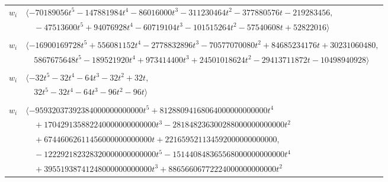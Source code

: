 \documentclass[11pt]{article}
\begin{document}
\begin{longtable}{@{}ll@{}}
$w_i$ & $\langle -70189056t^{5}-147881984t^{4}-86016000t^{3}-311230464t^{2}-377880576t-219283456,$\\
 & $\quad -47513600t^{5}+94076928t^{4}-60719104t^{3}-101515264t^{2}-57540608t+52822016\rangle$\\
\addlinespace[2pt]
\multicolumn{2}{@{}p{0.97\textwidth}@{}}{$i=39$, $D_i=128$, $e_i=2$, $\rho_{ij}$: $0{:}3, \allowbreak 2{:}3, \allowbreak 5{:}2, \allowbreak 7{:}2, \allowbreak 20{:}1, \allowbreak 21{:}1, \allowbreak 22{:}2, \allowbreak 23{:}2, \allowbreak 24{:}3, \allowbreak 25{:}1, \allowbreak 44{:}2, \allowbreak 49{:}2, \allowbreak 50{:}1, \allowbreak 52{:}2, \allowbreak 53{:}3, \allowbreak 64{:}3, \allowbreak 79{:}2, \allowbreak 80{:}3$}\\
$w_i$ & $\langle -16900169728t^{5}+556081152t^{4}-2778832896t^{3}-70577070080t^{2}+84685234176t+30231060480,$\\
 & $\quad 5867675648t^{5}-189521920t^{4}+973414400t^{3}+24501018624t^{2}-29413711872t-10498940928\rangle$\\
\addlinespace[2pt]
\multicolumn{2}{@{}p{0.97\textwidth}@{}}{$i=40$, $D_i=4$, $e_i=3$, $\rho_{ij}$: $3{:}3, \allowbreak 6{:}1, \allowbreak 7{:}1, \allowbreak 8{:}3, \allowbreak 44{:}1, \allowbreak 62{:}3$}\\
$w_i$ & $\langle -32t^{5}-32t^{4}-64t^{3}-32t^{2}+32t,$\\
 & $\quad 32t^{5}-32t^{4}-64t^{3}-96t^{2}-96t\rangle$\\
\addlinespace[2pt]
\multicolumn{2}{@{}p{0.97\textwidth}@{}}{$i=41$, $D_i=250000000000$, $e_i=1$, $\rho_{ij}$: $0{:}3, \allowbreak 1{:}1, \allowbreak 3{:}2, \allowbreak 6{:}2, \allowbreak 7{:}2, \allowbreak 8{:}3, \allowbreak 9{:}2, \allowbreak 10{:}2, \allowbreak 11{:}3, \allowbreak 12{:}2, \allowbreak 13{:}2, \allowbreak 14{:}3, \allowbreak 26{:}1, \allowbreak 29{:}3, \allowbreak 30{:}2, \allowbreak 31{:}3, \allowbreak 45{:}3, \allowbreak 59{:}1, \allowbreak 60{:}1, \allowbreak 61{:}3, \allowbreak 66{:}2, \allowbreak 70{:}3, \allowbreak 77{:}3, \allowbreak 80{:}1$}\\
$w_i$ & $\langle -95932037392384000000000000t^{5}+81288094168064000000000000t^{4}$\\
 & $\quad +170429135882240000000000000t^{3}-281848236300288000000000000t^{2}$\\
 & $\quad +67446062611456000000000000t+221659521134592000000000000,$\\
 & $\quad -122292182328320000000000000t^{5}-151440848365568000000000000t^{4}$\\
 & $\quad +39551938741248000000000000t^{3}+88656606772224000000000000t^{2}$\\

\end{longtable}
\end{document}
